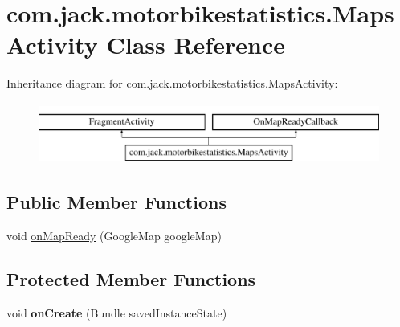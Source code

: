 \hypertarget{classcom_1_1jack_1_1motorbikestatistics_1_1_maps_activity}{}\section{com.\+jack.\+motorbikestatistics.\+Maps\+Activity Class Reference}
\label{classcom_1_1jack_1_1motorbikestatistics_1_1_maps_activity}
Inheritance diagram for com.\+jack.\+motorbikestatistics.\+Maps\+Activity\+:\begin{figure}[H]
\begin{center}
\leavevmode
\includegraphics[height=2.000000cm]{classcom_1_1jack_1_1motorbikestatistics_1_1_maps_activity}
\end{center}
\end{figure}
\subsection*{Public Member Functions}
\begin{DoxyCompactItemize}
\item 
void \hyperlink{classcom_1_1jack_1_1motorbikestatistics_1_1_maps_activity_aefa35b548b2f39bb46b2cb5024be383c}{on\+Map\+Ready} (Google\+Map google\+Map)
\end{DoxyCompactItemize}
\subsection*{Protected Member Functions}
\begin{DoxyCompactItemize}
\item 
\mbox{\label{classcom_1_1jack_1_1motorbikestatistics_1_1_maps_activity_afd23eb0cf651de276a9b85bb5fa609b8}} 
void {\bfseries on\+Create} (Bundle saved\+Instance\+State)
\end{DoxyCompactItemize}
